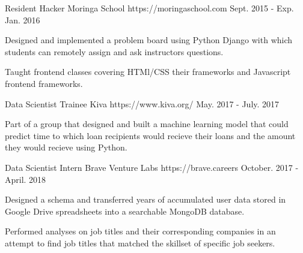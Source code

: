 \begin{cventries}
  \cventry
    {Resident Hacker}
    {Moringa School}
    {https://moringaschool.com}
    {Sept. 2015 - Exp. Jan. 2016}
    {
      \begin{cvitems}
         \item {Designed and implemented a problem board using Python Django with which students can remotely assign and ask instructors questions.}
        \item {Taught frontend classes covering HTMl/CSS their frameworks and Javascript frontend frameworks.}
      \end{cvitems}
    }
  \cventry
    {Data Scientist Trainee}
    {Kiva}
    {https://www.kiva.org/}
    {May. 2017 - July. 2017 }
    {
      \begin{cvitems}
        \item { Part of a group that designed and built a machine learning model that could predict time to which loan recipients would recieve their loans and the amount they would recieve using Python.}
      \end{cvitems}
    }
  \cventry
    {Data Scientist Intern}
    {Brave Venture Labs}
    {https://brave.careers}
    {October. 2017 - April. 2018}
    {
      \begin{cvitems}
        \item {Designed a schema and transferred years of accumulated user data stored in Google Drive spreadsheets into a searchable MongoDB database.}
        \item {Performed analyses on job titles and their corresponding companies in an attempt to find job titles that matched the skillset of specific job seekers.}
      \end{cvitems}
    }

\end{cventries}
